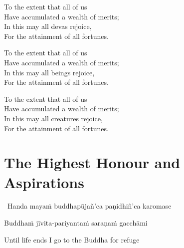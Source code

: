 \ifafive\clearpage\fi

\begin{english-verses}
  To the extent that all of us\\
  Have accumulated a wealth of merits;\\
  In this may all devas rejoice,\\
  For the attainment of all fortunes.
\end{english-verses}

\ifninebythirteen\clearpage\fi

\begin{english-verses}
  To the extent that all of us\\
  Have accumulated a wealth of merits;\\
  In this may all beings rejoice,\\
  For the attainment of all fortunes.
\end{english-verses}

\begin{english-verses}
  To the extent that all of us\\
  Have accumulated a wealth of merits;\\
  \ifbfive\enlargethispage{1.5\baselineskip}\fi
  In this may all creatures rejoice,\\
  For the attainment of all fortunes.
\end{english-verses}

\suttaRef{[MJG]}

\ifdigital{}\fi



\section{The Highest Honour and Aspirations}
\label{highest-honour-aspirations}

\begin{leader}
  \anglebracketleft\ \hspace{-0.5mm}Handa mayaṁ buddhapūjañ'ca paṇidhiñ'ca karomase \hspace{-0.5mm}\anglebracketright\
\end{leader}

Buddhaṁ jīvita-pariyantaṁ saraṇaṁ gacchāmi

\begin{english}
  Until life ends I go to the Buddha for refuge
\end{english}

